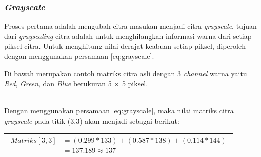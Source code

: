 \subsubsection{\textit{Grayscale}}
\noindent Proses pertama adalah mengubah citra masukan menjadi citra \textit{grayscale}, tujuan dari \textit{grayscaling} citra adalah untuk menghilangkan informasi warna dari setiap piksel citra. Untuk menghitung nilai derajat keabuan setiap piksel, diperoleh dengan menggunakan persamaan \ref{eq:grayscale}.

\noindent Di bawah merupakan contoh matriks citra asli dengan 3 \textit{channel} warna yaitu \textit{Red}, \textit{Green}, dan \textit{Blue} berukuran 5 $\times$ 5 piksel. \\

\begin{adjustbox}{width=1\textwidth}
	\noindent\begin{minipage}{\linewidth}
		\label{fig:MatriksCitraAsal}
	\end{minipage}
\end{adjustbox} \\

\noindent Dengan menggunakan persamaan \ref{eq:grayscale}, maka nilai matriks citra \textit{grayscale} pada titik (3,3) akan menjadi sebagai berikut:
\begin{table}[H]
	\begin{adjustbox}{width=1\textwidth}
		\begin{tabular}{|p{13.55cm}|}
			\hline
			\begin{equation}\nonumber
			\begin{aligned}
			Matriks[3,3] &= (0.299 * 133) + (0.587 * 138) + (0.114 * 144) \\
						 &= 137.189 \approx 137 
			\end{aligned}
			\end{equation}\\
			\hline
		\end{tabular}
	\end{adjustbox}
\end{table}

